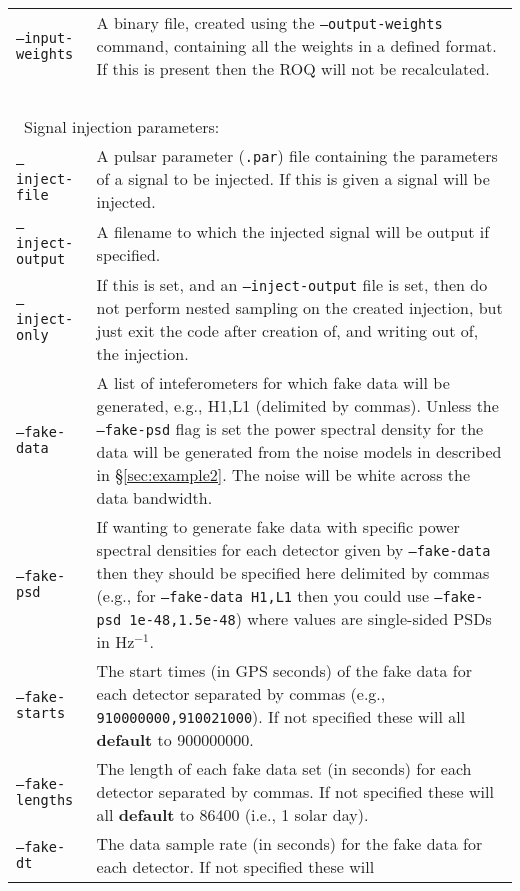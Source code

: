 \begin{footnotesize}
\begin{longtable}{|p{}p{}|}
 {\tt --input-weights}   &  A binary file, created using the {\tt --output-weights} command, containing all the weights in a defined format.
                            If this is present then the ROQ will not be recalculated. \\
 ~ & ~ \\
\multicolumn{2}{|l|}{~Signal injection parameters:} \\
 {\tt --inject-file}     &  A pulsar parameter ({\tt .par}) file containing the parameters of a signal to be injected. If this is
                           given a signal will be injected. \\
 {\tt --inject-output}   &  A filename to which the injected signal will be output if specified. \\
 {\tt --inject-only}     &  If this is set, and an {\tt --inject-output} file is set, then do not perform nested sampling on the
                            created injection, but just exit the code after creation of, and writing out of, the injection. \\
 {\tt --fake-data}       &  A list of inteferometers for which fake data will be generated, e.g., H1,L1 (delimited by commas). Unless
                            the {\tt --fake-psd} flag is set the power spectral density for the data will be generated from the
                            noise models in described in \S\ref{sec:example2}. The noise will be white across the data bandwidth. \\
 {\tt --fake-psd}        &  If wanting to generate fake data with specific power spectral densities for each detector given
                            by {\tt --fake-data} then they should be specified here delimited by commas (e.g., for {\tt --fake-data H1,L1}
                            then you could use {\tt --fake-psd 1e-48,1.5e-48}) where values are single-sided PSDs in Hz$^{-1}$. \\
 {\tt --fake-starts}     &  The start times (in GPS seconds) of the fake data for each detector separated by commas (e.g.,
                            {\tt 910000000,910021000}). If not specified these will all {\bf default} to 900000000. \\
 {\tt --fake-lengths}    &  The length of each fake data set (in seconds) for each detector separated by commas. If not
                            specified these will all {\bf default} to 86400 (i.e., 1 solar day). \\
 {\tt --fake-dt}         &  The data sample rate (in seconds) for the fake data for each detector. If not specified these will

\end{longtable}
\end{footnotesize}
